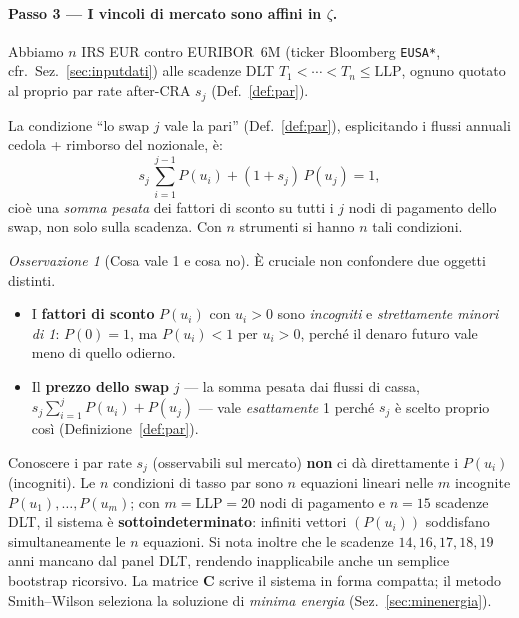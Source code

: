\documentclass[11pt,a4paper]{article}
\theoremstyle{plain}
\theoremstyle{definition}
\theoremstyle{remark}
\newtheorem*{osservazione}{Osservazione}
\newcommand{\LLP}{\ensuremath{\mathrm{LLP}}}
\begin{document}
\paragraph{Passo 3 --- I vincoli di mercato sono affini in $\zeta$.}
Abbiamo $n$ IRS EUR contro EURIBOR~6M (ticker Bloomberg \texttt{EUSA*},
cfr.~Sez.~\ref{sec:inputdati}) alle scadenze DLT $T_1<\cdots<T_n\le\LLP$, ognuno quotato al
proprio par rate after-CRA $s_j$ (Def.~\ref{def:par}).

La condizione ``lo swap $j$ vale la pari'' (Def.~\ref{def:par}), esplicitando i flussi
annuali cedola + rimborso del nozionale, \`e:
\[
  s_j\,\sum_{i=1}^{j-1} P(u_i) + (1+s_j)\,P(u_j) = 1,
\]
cio\`e una \emph{somma pesata} dei fattori di sconto su tutti i $j$ nodi di pagamento dello
swap, non solo sulla scadenza. Con $n$ strumenti si hanno $n$ tali condizioni.

\begin{osservazione}[Cosa vale 1 e cosa no]
\label{oss:pari}
\`E cruciale non confondere due oggetti distinti.
\begin{itemize}
  \item I \textbf{fattori di sconto} $P(u_i)$ con $u_i > 0$ sono \emph{incogniti} e
        \emph{strettamente minori di 1}: $P(0)=1$, ma $P(u_i) < 1$ per $u_i>0$, perch\'e il
        denaro futuro vale meno di quello odierno.
  \item Il \textbf{prezzo dello swap} $j$ --- la somma pesata dai flussi di cassa,
        $s_j\sum_{i=1}^{j}P(u_i)+P(u_j)$ --- vale \emph{esattamente} 1 perch\'e $s_j$
        \`e scelto proprio cos\`i (Definizione~\ref{def:par}).
\end{itemize}
Conoscere i par rate $s_j$ (osservabili sul mercato) \textbf{non} ci d\`a direttamente i
$P(u_i)$ (incogniti). Le $n$ condizioni di tasso par sono $n$ equazioni lineari nelle $m$
incognite $P(u_1),\ldots,P(u_m)$; con $m = \LLP = 20$ nodi di pagamento e $n = 15$ scadenze
DLT, il sistema \`e \textbf{sottoindeterminato}: infiniti vettori $(P(u_i))$ soddisfano
simultaneamente le $n$ equazioni. Si nota inoltre che le scadenze $14, 16, 17, 18, 19$ anni
mancano dal panel DLT, rendendo inapplicabile anche un semplice bootstrap ricorsivo. La
matrice $\mathbf{C}$ scrive il sistema in forma compatta; il metodo Smith--Wilson seleziona
la soluzione di \emph{minima energia} (Sez.~\ref{sec:minenergia}).
\end{osservazione}
\end{document}
